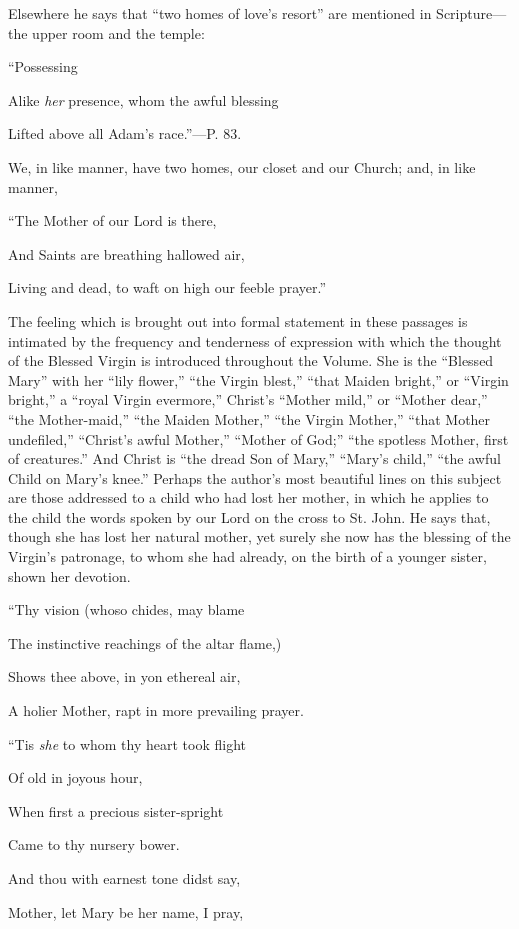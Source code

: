 Elsewhere he says that ``two homes of love's
resort'' are mentioned in Scripture—the upper room and the temple:

``Possessing

Alike \emph{her} presence, whom the awful blessing

Lifted above all Adam's race.''—P. 83.

We, in like manner, have two homes, our closet
and our Church; and, in like manner,

``The Mother of our Lord is there,

And Saints are
breathing hallowed air,

Living and dead, to waft on high our feeble prayer.''

The feeling which is brought out into formal
statement in these passages is intimated by the frequency and
tenderness of expression with which the thought of the Blessed Virgin
is introduced throughout the Volume. She is the ``Blessed Mary'' with
her ``lily flower,'' ``the Virgin blest,'' ``that Maiden bright,'' or ``Virgin
bright,'' a ``royal Virgin evermore,'' Christ's ``Mother mild,'' or ``Mother dear,'' ``the Mother-maid,'' ``the Maiden Mother,'' ``the
Virgin Mother,'' ``that Mother undefiled,'' ``Christ's awful Mother,'' ``Mother
of God;'' ``the spotless Mother, first of creatures.'' And Christ is ``the
dread Son of Mary,'' ``Mary's child,'' ``the awful Child on Mary's knee.''
Perhaps the author's most beautiful lines on this subject are those
addressed to a child who had lost her mother, in which he applies to
the child the words spoken by our Lord on the cross to St. John. He
says that, though she has lost her natural mother, yet surely she now
has the blessing of the Virgin's patronage, to whom she had already,
on the birth of a younger sister, shown her devotion.

``Thy
vision (whoso chides, may blame

The instinctive reachings of the altar flame,)

Shows thee above, in yon ethereal air,

A holier Mother, rapt in more prevailing prayer.

``Tis \emph{she}
to whom thy heart took flight

Of old in joyous hour,

When first a precious sister-spright

Came to thy nursery bower.

And thou with earnest tone didst say,

Mother, let Mary be her name, I pray,

